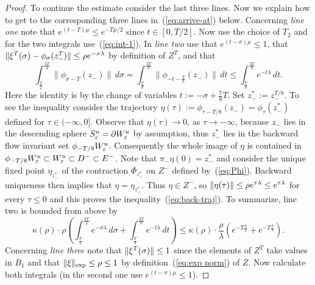 \documentclass{article}
\begin{document}
\begin{proof}
To continue the estimate consider the last three lines. Now we explain how to get to the
corresponding three lines in~(\ref{eq:arrive-at}) below. Concerning \emph{line one} note that
$ e^{(t-T)\mu}\le e^{-T\mu/2}$ since $t\in[0,T/2]$.
Now use the choice of $T_2$ and for the two integrals use~(\ref{eq:int-1}).
In \emph{line two} use that $e^{(t-\sigma)\mu}\le1$, that
$
     \mathopen\|\xi^T(\sigma)
     -\phi_\sigma({z_-^T})\mathclose\|
     \le\rho e^{-\sigma\lambda}
$
by definition of $Z^T$, and that
\begin{equation}\label{eq:back-traj}
     \int_{\frac{T}{2}}^{\frac{3T}{4}}
     \bigl\|\phi_{\sigma-T}({z_-})\bigr\|\, d\sigma
     =
     \int_{\frac{T}{8}}^{\frac{3T}{8}}
     \bigl\|\phi_{-t-\frac{T}{8}}({z_-})\bigr\|\, dt
     \le
     \int_{\frac{T}{8}}^{\frac{3T}{8}} e^{-t\lambda}\, dt.
\end{equation}
Here the identity is by the change of variables $t:=-\sigma+\frac{7}{8}T$.
Set $z_-^*:=z_-^{T/8}$. To see the inequality consider the trajectory $\eta(\tau):=\phi_{\tau-T/8}({z_-})
=\phi_\tau(z_-^*)$ defined for $\tau\in(-\infty,0]$. Observe that $\eta(\tau)\to 0$, as $\tau\to-\infty$,
because ${z_-}$ lies in the descending sphere $S^u_{\varepsilon}={\partial} W^u_{\varepsilon}$ by assumption, thus $z_-^*$ lies
in the backward flow invariant set $\phi_{-T/8}W^u_{\varepsilon}$. Consequently the whole image of $\eta$ is
contained in $\phi_{-T/8}W^u_{\varepsilon}\subset W^u_{\varepsilon}\subset D^-\subset E^-$. Note that $\pi_-\eta(0)=z_-^*$
and consider the unique fixed point $\eta_{z_-^*}$ of the contraction $\Phi_{z_-^*}$
on $Z^-$ defined by~(\ref{eq:Phi}). Backward uniqueness then implies that
$\eta=\eta_{z_-^*}$. Thus $\eta\in Z^-$, so $\mathopen\|\eta(\tau)\mathclose\|\le\rho e^{\tau\lambda}
\le e^{\tau\lambda}$ for every $\tau\le0$ and this proves the inequality~(\ref{eq:back-traj}).
To summarize, line two is bounded from above by
\begin{equation*}
      \kappa(\rho)\cdot\rho
      \left(
     \int_{\frac{T}{2}}^{\frac{3T}{4}} e^{-\sigma\lambda}
     \, d\sigma
     +\int_{\frac{T}{8}}^{\frac{3T}{8}} e^{-t\lambda}\, dt
     \right)
     \le
     \kappa(\rho)\cdot\frac{\rho}{\lambda}
     \left(
     e^{-T\frac{\lambda}{2}}
     +e^{-T\frac{\lambda}{8}}
     \right).
\end{equation*}
Concerning \emph{line three} note that $\mathopen\|\xi^T(\sigma)\mathclose\|\le 1$
since the elements of $Z^T$ take values in $B_1$ and that $\mathopen\|\xi\mathclose\|_{\exp}\le\rho
\le 1$ by definition~(\ref{eq:exp norm}) of $Z$.
Now calculate both integrals (in the second one use $e^{(t-\sigma)\mu}\le1$).


\end{proof}
\end{document}
